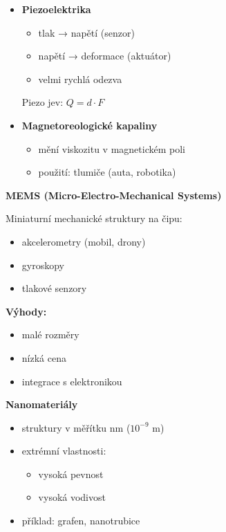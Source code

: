 \documentclass[a4paper,10pt]{article}
\begin{document}
\begin{vysvetlenibox}
\begin{itemize}
\item \textbf{Piezoelektrika}
    \begin{itemize}
    \item tlak → napětí (senzor)
    \item napětí → deformace (aktuátor)
    \item velmi rychlá odezva
    \end{itemize}

\begin{vzorcebox}
Piezo jev: $Q = d \cdot F$
\end{vzorcebox}

\item \textbf{Magnetoreologické kapaliny}
    \begin{itemize}
    \item mění viskozitu v magnetickém poli
    \item použití: tlumiče (auta, robotika)
    \end{itemize}
\end{itemize}

\textbf{MEMS (Micro-Electro-Mechanical Systems)}

Miniaturní mechanické struktury na čipu:

\begin{itemize}
\item akcelerometry (mobil, drony)
\item gyroskopy
\item tlakové senzory
\end{itemize}

\textbf{Výhody:}
\begin{itemize}
\item malé rozměry
\item nízká cena
\item integrace s elektronikou
\end{itemize}

\textbf{Nanomateriály}

\begin{itemize}
\item struktury v měřítku nm ($10^{-9}$ m)
\item extrémní vlastnosti:
\begin{itemize}
\item vysoká pevnost
\item vysoká vodivost
\end{itemize}
\item příklad: grafen, nanotrubice
\end{itemize}


\end{vysvetlenibox}
\end{document}
